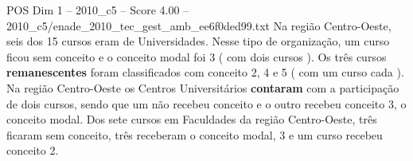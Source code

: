 \begin{textsample}{POS Dim 1 – 2010\_c5 – Score 4.00 – 2010\_c5/enade\_2010\_tec\_gest\_amb\_ee6f0ded99.txt}
Na região Centro-Oeste, seis dos 15 cursos eram de Universidades.
Nesse tipo de organização, um curso ficou sem conceito e o conceito modal foi 3 ( com dois cursos ).
Os três cursos \textbf{remanescentes} foram classificados com conceito 2, 4 e 5 ( com um curso cada ).
Na região Centro-Oeste os Centros Universitários \textbf{contaram} com a participação de dois cursos, sendo que um não recebeu conceito e o outro recebeu conceito 3, o conceito modal.
Dos sete cursos em Faculdades da região Centro-Oeste, três ficaram sem conceito, três receberam o conceito modal, 3 e um curso recebeu conceito 2.

\end{textsample}

